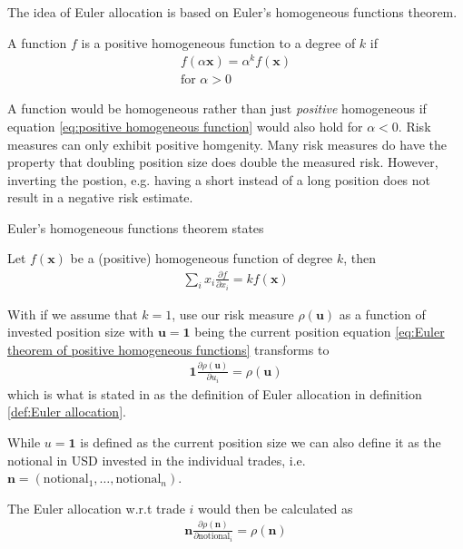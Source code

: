 \documentclass[../Thesis_AHoecherl.tex]{subfiles}
\begin{document}
The idea of Euler allocation is based on Euler's homogeneous functions theorem. 

\begin{definition}
    A function $f$ is a positive homogeneous function to a degree of $k$ if 
    \begin{align} \label{eq:positive homogeneous function}
        f\left(\alpha \mathbf{x}\right) = \alpha^k f\left(\mathbf{x}\right) \\
        \text{for } \alpha >0
    \end{align}
\end{definition}

A function would be homogeneous rather than just \emph{positive} homogeneous if equation \ref{eq:positive homogeneous function} would also hold for $\alpha < 0$.
Risk measures can only exhibit positive homgenity. Many risk measures do have the property that doubling position size does double the measured risk. 
However, inverting the postion, e.g. having a short instead of a long position does not result in a negative risk estimate. 

Euler's homogeneous functions theorem states
\begin{theorem}
    Let $f\left(\mathbf{x}\right)$ be a (positive) homogeneous function of degree $k$, then
    \begin{align}
        \sum_i{x_i \frac{\partial f}{\partial x_i}} = k f(\mathbf{x})
        \label{eq:Euler theorem of positive homogeneous functions}
    \end{align}
\end{theorem}

With if we assume that $k=1$, use our risk measure $\rho(\mathbf{u})$ as a function of invested position size with $\mathbf{u} = \mathbf{1}$ being the current position equation \ref{eq:Euler theorem of positive homogeneous functions} transforms to
\begin{align}
    \mathbf{1}\frac{\partial \rho(\mathbf{u})}{\partial u_i} = \rho(\mathbf{u})
    \label{eq:relative bump euler allocation}
\end{align}
which is what is stated in as the definition of Euler allocation in definition \ref{def:Euler allocation}.

While $u = \mathbf{1}$ is defined as the current position size we can also define it as the notional in USD invested in the individual trades, i.e. $\mathbf{n} = (\text{notional}_1, \dots, \text{notional}_n)$.

The Euler allocation w.r.t trade $i$ would then be calculated as
\begin{align}
    \mathbf{n}\frac{\partial \rho(\mathbf{n})}{\partial \text{notional}_i} = \rho(\mathbf{n})
    \label{eq:notional based euler allocation}
\end{align}
\end{document}
